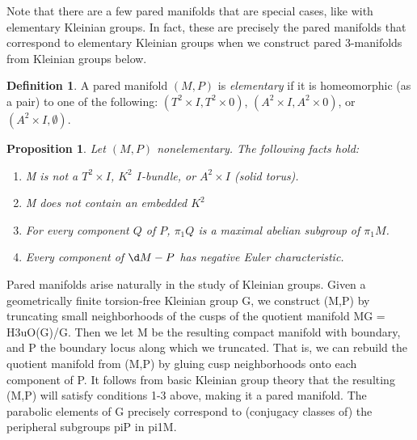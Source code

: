 \documentclass[12pt]{amsart}
\newtheorem{prop}[theorem]{Proposition}
\theoremstyle{definition}
\newtheorem{Def}[theorem]{Definition}
\def\x{\times}
\begin{document}
Note that there are a few pared manifolds that are special cases,
like with elementary Kleinian groups. In fact, these are precisely the pared
manifolds that correspond to elementary Kleinian groups when we construct pared
3-manifolds from Kleinian groups below.

\begin{Def}

A pared manifold $(M,P)$ is \emph{elementary} if it is homeomorphic (as a pair)
to one of the following: $(T^2\x I,T^2\x 0)$, $(A^2\x I,A^2\x 0)$, or $(A^2\x
I,\emptyset)$.

\end{Def}

\begin{prop}

Let $(M,P)$ nonelementary. The following facts hold:

\begin{enumerate}
\item M is not a $T^2\x I$, $K^2$ $I$-bundle, or $A^2\x I$ (solid torus).
\item M does not contain an embedded $K^2$
\item For every component $Q$ of $P$, $\pi_1Q$ is a maximal abelian subgroup of
$\pi_1M$.
\item Every component of $\d M-P$ has negative Euler characteristic.
\end{enumerate}

\end{prop}

Pared manifolds arise naturally in the study of Kleinian groups. Given
a geometrically finite torsion-free Kleinian group G, we construct (M,P) by
truncating small neighborhoods of the cusps of the quotient manifold MG
= H3uO(G)/G.  Then we let M be the resulting compact manifold with boundary,
and P the boundary locus along which we truncated. That is, we can rebuild the
quotient manifold from (M,P) by gluing cusp neighborhoods onto each component
of P. It follows from basic Kleinian group theory that the resulting (M,P) will
satisfy conditions 1-3 above, making it a pared manifold. The parabolic
elements of G precisely correspond to (conjugacy classes of) the peripheral
subgroups piP in pi1M.
\end{document}
